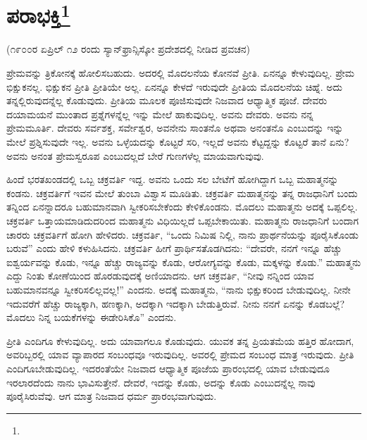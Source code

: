 
\chapter[ಪರಾಭಕ್ತಿ]{ಪರಾಭಕ್ತಿ\protect\footnote{}}

\begin{center}
(೧೯೦೦ರ ಏಪ್ರಿಲ್ ೧೨ ರಂದು ಸ್ಯಾನ್‌ಫ್ರಾನ್ಸಿಸ್ಕೋ ಪ್ರದೇಶದಲ್ಲಿ ನೀಡಿದ ಪ್ರವಚನ)
\end{center}

ಪ್ರೇಮವನ್ನು ತ್ರಿಕೋನಕ್ಕೆ ಹೋಲಿಸಬಹುದು. ಅದರಲ್ಲಿ ಮೊದಲನೆಯ ಕೋನವೆ ಪ್ರೀತಿ. ಏನನ್ನೂ ಕೇಳುವುದಿಲ್ಲ. ಪ್ರೇಮ ಭಿಕ್ಷುಕನಲ್ಲ. ಭಿಕ್ಷುಕನ ಪ್ರೀತಿ ಪ್ರೀತಿಯೇ ಅಲ್ಲ. ಏನನ್ನೂ ಕೇಳದೆ ಇರುವುದೇ ಪ್ರೀತಿಯ ಮೊದಲನೆಯ ಚಿಹ್ನೆ. ಅದು ತನ್ನಲ್ಲಿರುವುದನ್ನೆಲ್ಲ ಕೊಡುವುದು. ಪ್ರೀತಿಯ ಮೂಲಕ ಪೂಜಿಸುವುದೇ ನಿಜವಾದ ಆಧ್ಯಾತ್ಮಿಕ ಪೂಜೆ. ದೇವರು ದಯಾಮಯನೆ ಮುಂತಾದ ಪ್ರಶ್ನೆಗಳನ್ನೆಲ್ಲ ಇನ್ನು ಮೇಲೆ ಹಾಕುವುದಿಲ್ಲ. ಅವನು ದೇವರು. ಅವನು ನನ್ನ ಪ್ರೇಮಮೂರ್ತಿ. ದೇವರು ಸರ್ವಶಕ್ತ, ಸರ್ವೇಶ್ವರ, ಅವನೇನು ಸಾಂತನೊ ಅಥವಾ ಅನಂತನೊ ಎಂಬುದನ್ನು ಇನ್ನು ಮೇಲೆ ಪ್ರಶ್ನಿಸುವುದೇ ಇಲ್ಲ. ಅವನು ಒಳ್ಳೆಯದನ್ನು ಕೊಟ್ಟರೆ ಸರಿ, ಇಲ್ಲದೆ ಅವನು ಕೆಟ್ಟದ್ದನ್ನು ಕೊಟ್ಟರೆ ತಾನೆ ಏನು? ಅವನು ಅನಂತ ಪ್ರೇಮಸ್ವರೂಪ ಎಂಬುದಲ್ಲದೆ ಬೇರೆ ಗುಣಗಳೆಲ್ಲ ಮಾಯವಾಗುವುವು.

\vskip 3pt

ಹಿಂದೆ ಭರತಖಂಡದಲ್ಲಿ ಒಬ್ಬ ಚಕ್ರವರ್ತಿ ಇದ್ದ. ಅವನು ಒಂದು ಸಲ ಬೇಟೆಗೆ ಹೋಗಿದ್ದಾಗ ಒಬ್ಬ ಮಹಾತ್ಮನನ್ನು ಕಂಡನು. ಚಕ್ರವರ್ತಿಗೆ ಇವನ ಮೇಲೆ ತುಂಬಾ ವಿಶ್ವಾಸ ಮೂಡಿತು. ಚಕ್ರವರ್ತಿ ಮಹಾತ್ಮನನ್ನು ತನ್ನ ರಾಜಧಾನಿಗೆ ಬಂದು ತನ್ನಿಂದ ಏನನ್ನಾದರೂ ಬಹುಮಾನವಾಗಿ ಸ್ವೀಕರಿಸಬೇಕೆಂದು ಕೇಳಿಕೊಂಡನು. ಮೊದಲು ಮಹಾತ್ಮನು ಅದಕ್ಕೆ ಒಪ್ಪಲಿಲ್ಲ. ಚಕ್ರವರ್ತಿ ಒತ್ತಾಯಮಾಡಿದುದರಿಂದ ಮಹಾತ್ಮನು ವಿಧಿಯಿಲ್ಲದೆ ಒಪ್ಪಬೇಕಾಯಿತು. ಮಹಾತ್ಮನು ರಾಜಧಾನಿಗೆ ಬಂದಾಗ ಚಾರರು ಚಕ್ರವರ್ತಿಗೆ ಹೋಗಿ ಹೇಳಿದರು. ಚಕ್ರವರ್ತಿ, “ಒಂದು ನಿಮಿಷ ನಿಲ್ಲಿ, ನಾನು ಪ್ರಾರ್ಥನೆಯನ್ನು ಪೂರೈಸಿಕೊಂಡು ಬರುವೆ'' ಎಂದು ಹೇಳಿ ಕಳುಹಿಸಿದನು. ಚಕ್ರವರ್ತಿ ಹೀಗೆ ಪ್ರಾರ್ಥಿಸತೊಡಗಿದನು: “ದೇವರೇ, ನನಗೆ ಇನ್ನೂ ಹೆಚ್ಚು ಐಶ್ವರ್ಯವನ್ನು ಕೊಡು, ಇನ್ನೂ ಹೆಚ್ಚು ರಾಜ್ಯವನ್ನು ಕೊಡು, ಆರೋಗ್ಯವನ್ನು ಕೊಡು, ಮಕ್ಕಳನ್ನು ಕೊಡು.” ಮಹಾತ್ಮನು ಎದ್ದು ನಿಂತು ಕೋಣೆಯಿಂದ ಹೊರಡುವುದಕ್ಕೆ ಅಣಿಯಾದನು. ಆಗ ಚಕ್ರವರ್ತಿ, “ನೀವು ನನ್ನಿಂದ ಯಾವ ಬಹುಮಾನವನ್ನೂ ಸ್ವೀಕರಿಸಲಿಲ್ಲವಲ್ಲ!'' ಎಂದನು. ಅದಕ್ಕೆ ಮಹಾತ್ಮನು, “ನಾನು ಭಿಕ್ಷುಕರಿಂದ ಬೇಡುವುದಿಲ್ಲ. ನೀನೇ ಇದುವರೆಗೆ ಹೆಚ್ಚು ರಾಜ್ಯಕ್ಕಾಗಿ, ಹಣಕ್ಕಾಗಿ, ಅದಕ್ಕಾಗಿ ಇದಕ್ಕಾಗಿ ಬೇಡುತ್ತಿರುವೆ. ನೀನು ನನಗೆ ಏನನ್ನು ಕೊಡಬಲ್ಲೆ? ಮೊದಲು ನಿನ್ನ ಬಯಕೆಗಳನ್ನು ಈಡೇರಿಸಿಕೊ” ಎಂದನು.

\vskip 3pt

ಪ್ರೀತಿ ಎಂದಿಗೂ ಕೇಳುವುದಿಲ್ಲ. ಅದು ಯಾವಾಗಲೂ ಕೊಡುವುದು. ಯುವಕ ತನ್ನ ಪ್ರಿಯತಮೆಯ ಹತ್ತಿರ ಹೋದಾಗ, ಅವರಿಬ್ಬರಲ್ಲಿ ಯಾವ ವ್ಯಾಪಾರದ ಸಂಬಂಧವೂ ಇರುವುದಿಲ್ಲ. ಅವರಲ್ಲಿ ಪ್ರೇಮದ ಸಂಬಂಧ ಮಾತ್ರ ಇರುವುದು. ಪ್ರೀತಿ ಎಂದಿಗೂ\break ಬೇಡುವುದಿಲ್ಲ. ಇದರಂತೆಯೇ ನಿಜವಾದ ಆಧ್ಯಾತ್ಮಿಕ ಪೂಜೆಯ ಪ್ರಾರಂಭದಲ್ಲಿ ಯಾವ ಬೇಡುವುದೂ ಇರಲಾರದೆಂದು ನಾನು ಭಾವಿಸುತ್ತೇನೆ. ದೇವರೆ, ಇದನ್ನು ಕೊಡು, ಅದನ್ನು ಕೊಡು ಎಂಬುದನ್ನೆಲ್ಲ ನಾವು ಪೂರೈಸಿರುವೆವು. ಆಗ ಮಾತ್ರ ನಿಜವಾದ ಧರ್ಮ ಪ್ರಾರಂಭವಾಗುವುದು.

